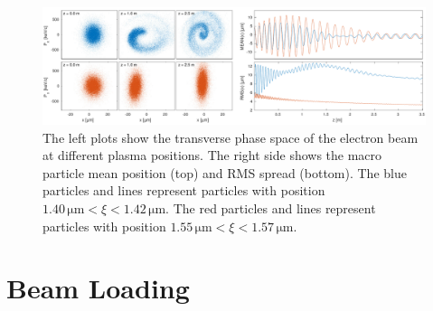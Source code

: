 \documentclass[aps,prstab,reprint,amsmath,amssymb,groupedaddress]{revtex4-1}
\newcommand{\unit}[1]{\,\mathrm{#1}}
\begin{document}
\begin{figure}[hbt]
    \includegraphics[width=\linewidth,trim={0mm 0mm 0mm 0mm},clip]{figures/beamFilamentationAll}
    \caption{\label{Fig:BeamFilament} The left plots show the transverse phase space of the electron beam at different
        plasma positions. The right side shows the macro particle mean position (top) and RMS spread (bottom). The blue
        particles and lines represent particles with position $1.40\unit{\mu m} < \xi < 1.42\unit{\mu m}$. The red
        particles and lines represent particles with position $1.55\unit{\mu m} < \xi < 1.57\unit{\mu m}$.}
\end{figure}

\section{Beam Loading}\label{S:BL}
\end{document}
